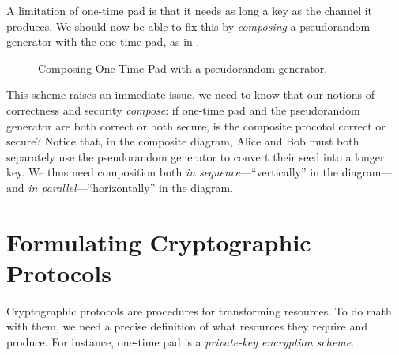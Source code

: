 \noindent
A limitation of one-time pad is that it needs as long a key as the channel it
produces. We should now be able to fix this by \emph{composing} a pseudorandom
generator with the one-time pad, as in .

\begin{figure}[h]
	\centering
	\caption{Composing One-Time Pad with a pseudorandom generator.}
	\label{fig:composed}
\end{figure}

This scheme raises an immediate issue.  we need to know that our notions of
correctness and security \emph{compose}: if one-time pad and the pseudorandom
generator are both correct or both secure, is the composite procotol correct or
secure? Notice that, in the composite diagram, Alice and Bob must both
separately use the pseudorandom generator to convert their seed into a longer
key. We thus need composition both \emph{in sequence}---``vertically'' in the
diagram---and \emph{in parallel}---``horizontally'' in the diagram.

\section{Formulating Cryptographic Protocols}

Cryptographic protocols are procedures for transforming resources. To do math
with them, we need a precise definition of what resources they require and
produce. For instance, one-time pad is a \emph{private-key encryption scheme}.


